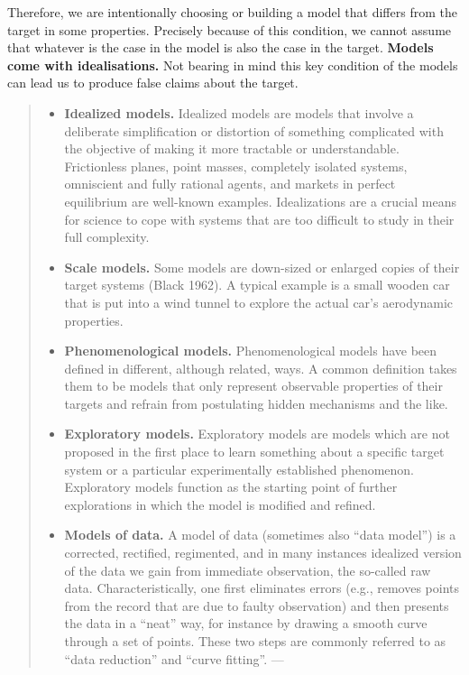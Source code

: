 \documentclass[
]{book}
\providecommand{\tightlist}{%
  \setlength{\itemsep}{0pt}\setlength{\parskip}{0pt}}
\begin{document}
Therefore, we are intentionally choosing or building a model that differs from the target in some properties. Precisely because of this condition, we cannot assume that whatever is the case in the model is also the case in the target. \textbf{Models come with idealisations.} Not bearing in mind this key condition of the models can lead us to produce false claims about the target.

\begin{quote}
\begin{itemize}
\tightlist
\item
  \textbf{Idealized models.} Idealized models are models that involve a deliberate simplification or distortion of something complicated with the objective of making it more tractable or understandable. Frictionless planes, point masses, completely isolated systems, omniscient and fully rational agents, and markets in perfect equilibrium are well-known examples. Idealizations are a crucial means for science to cope with systems that are too difficult to study in their full complexity.
\item
  \textbf{Scale models.} Some models are down-sized or enlarged copies of their target systems (Black 1962). A typical example is a small wooden car that is put into a wind tunnel to explore the actual car's aerodynamic properties.
\item
  \textbf{Phenomenological models.} Phenomenological models have been defined in different, although related, ways. A common definition takes them to be models that only represent observable properties of their targets and refrain from postulating hidden mechanisms and the like.
\item
  \textbf{Exploratory models.} Exploratory models are models which are not proposed in the first place to learn something about a specific target system or a particular experimentally established phenomenon. Exploratory models function as the starting point of further explorations in which the model is modified and refined.
\item
  \textbf{Models of data.} A model of data (sometimes also ``data model'') is a corrected, rectified, regimented, and in many instances idealized version of the data we gain from immediate observation, the so-called raw data. Characteristically, one first eliminates errors (e.g., removes points from the record that are due to faulty observation) and then presents the data in a ``neat'' way, for instance by drawing a smooth curve through a set of points. These two steps are commonly referred to as ``data reduction'' and ``curve fitting''.
  --- \citep{sep-models-science}
\end{itemize}
\end{quote}
\end{document}
